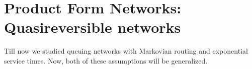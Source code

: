 \documentclass[all-lectures.tex]{subfiles}
\begin{document}

\setcounter{section}{2}
\setcounter{subsection}{0}

\section*{}
\section{Product Form Networks: Quasireversible networks}
Till now we studied queuing networks with Markovian routing and exponential service times.  Now, both of these assumptions will be generalized. 
\end{document}
